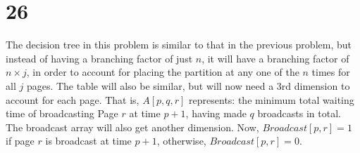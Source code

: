 \documentclass[letterpaper,notitlepage,twoside]{article}
\begin{document}
\section*{26}

The decision tree in this problem is similar to that in the previous problem, but instead of having a branching factor of just $n$, it will have a branching factor of $n\times j$, in order to account for placing the partition at any one of the $n$ times for all $j$ pages. The table will also be similar, but will now need a 3rd dimension to account for each page. That is, $A[p, q, r]$ represents: the minimum total waiting time of broadcasting Page $r$ at time $p + 1$, having made $q$ broadcasts in total. \\
The broadcast array will also get another dimension. Now, $Broadcast[p, r] = 1$ if page $r$ is broadcast at time $p + 1$, otherwise, $Broadcast[p, r] = 0$. \\

\begin{verbatim}

\end{verbatim}
\end{document}

